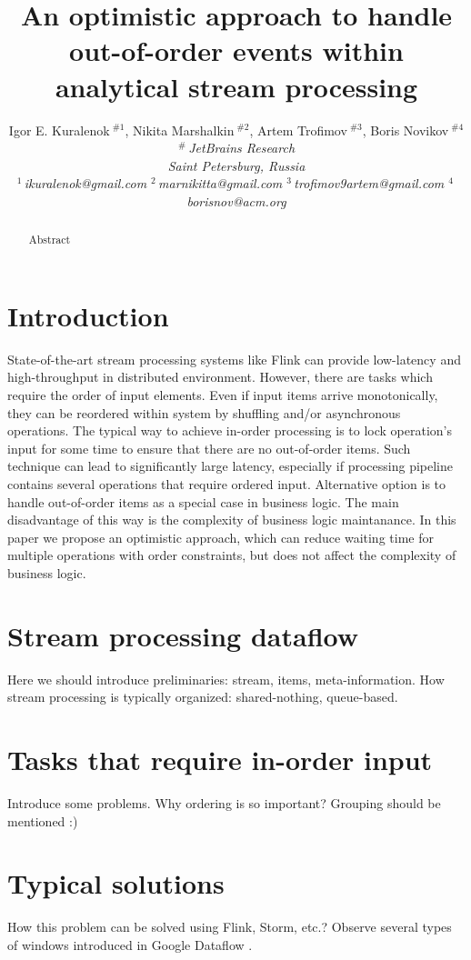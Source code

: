 \documentclass[10pt,conference,letterpaper]{IEEEtran}
\title{An optimistic approach to handle out-of-order events within analytical stream processing}
\author{%
{Igor E. Kuralenok{\small $~^{\#1}$}, 
    Nikita Marshalkin{\small $~^{\#2}$},
    Artem Trofimov{\small $~^{\#3}$}, 
        Boris Novikov{\small $~^{\#4}$} }%
\vspace{1.6mm}\\
\fontsize{10}{10}\selectfont\itshape
$^{\#}$\,JetBrains Research\\
Saint Petersburg, Russia\\
\fontsize{9}{9}\selectfont\ttfamily\upshape
%
$^1$\,ikuralenok@gmail.com   %
$^2$\,marnikitta@gmail.com    %
$^3$\,trofimov9artem@gmail.com   %
$^4$\,borisnov@acm.org 
}
\begin{document}
\maketitle
%
\begin{abstract} 
Abstract
\end{abstract}

%
\section {Introduction}
State-of-the-art stream processing systems like Flink \cite{carbone2015apache} can provide low-latency and high-throughput in distributed environment. However, there are tasks which require the order of input elements. Even if input items arrive monotonically, they can be reordered within system by shuffling and/or asynchronous operations. The typical way to achieve in-order processing is to lock operation's input for some time to ensure that there are no out-of-order items. Such technique can lead to significantly large latency, especially if processing pipeline contains several operations that require ordered input. Alternative option is to handle out-of-order items as a special case in business logic. The main disadvantage of this way is the complexity of business logic maintanance. In this paper we propose an optimistic approach, which can reduce waiting time for multiple operations with order constraints, but does not affect the complexity of business logic.

\section{Stream processing dataflow}
Here we should introduce preliminaries: stream, items, meta-information. How stream processing is typically organized: shared-nothing, queue-based.

\section{Tasks that require in-order input}
Introduce some problems. Why ordering is so important? Grouping should be mentioned :)

\section{Typical solutions}
How this problem can be solved using Flink, Storm, etc.? Observe several types of windows introduced in Google Dataflow \cite{Akidau:2015:DMP:2824032.2824076}.
\end{document}
